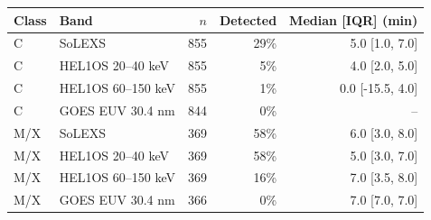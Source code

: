 \begin{tabular}{llrrr}
\toprule
Class & Band & $n$ & Detected & Median [IQR] (min) \\
\midrule
C & SoLEXS & 855 & 29\% & 5.0 [1.0, 7.0] \\
C & HEL1OS 20--40 keV & 855 & 5\% & 4.0 [2.0, 5.0] \\
C & HEL1OS 60--150 keV & 855 & 1\% & 0.0 [-15.5, 4.0] \\
C & GOES EUV 30.4 nm & 844 & 0\% & -- \\
M/X & SoLEXS & 369 & 58\% & 6.0 [3.0, 8.0] \\
M/X & HEL1OS 20--40 keV & 369 & 58\% & 5.0 [3.0, 7.0] \\
M/X & HEL1OS 60--150 keV & 369 & 16\% & 7.0 [3.5, 8.0] \\
M/X & GOES EUV 30.4 nm & 366 & 0\% & 7.0 [7.0, 7.0] \\
\bottomrule
\end{tabular}
